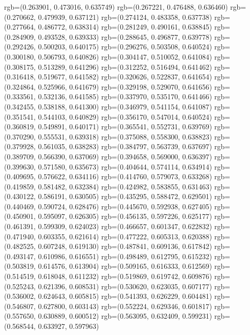 {{{					rgb=(0.263901, 0.473016, 0.635749)
					rgb=(0.267221, 0.476488, 0.636460)
					rgb=(0.270662, 0.479939, 0.637121)
					rgb=(0.274124, 0.483358, 0.637738)
					rgb=(0.277664, 0.486772, 0.638314)
					rgb=(0.281249, 0.490161, 0.638845)
					rgb=(0.284909, 0.493528, 0.639333)
					rgb=(0.288645, 0.496877, 0.639778)
					rgb=(0.292426, 0.500203, 0.640175)
					rgb=(0.296276, 0.503508, 0.640524)
					rgb=(0.300180, 0.506793, 0.640826)
					rgb=(0.304147, 0.510052, 0.641084)
					rgb=(0.308175, 0.513289, 0.641296)
					rgb=(0.312252, 0.516494, 0.641462)
					rgb=(0.316418, 0.519677, 0.641582)
					rgb=(0.320626, 0.522837, 0.641654)
					rgb=(0.324864, 0.525966, 0.641679)
					rgb=(0.329198, 0.529070, 0.641656)
					rgb=(0.333561, 0.532136, 0.641585)
					rgb=(0.337970, 0.535170, 0.641466)
					rgb=(0.342455, 0.538188, 0.641300)
					rgb=(0.346979, 0.541154, 0.641087)
					rgb=(0.351541, 0.544103, 0.640829)
					rgb=(0.356170, 0.547014, 0.640524)
					rgb=(0.360819, 0.549891, 0.640171)
					rgb=(0.365541, 0.552731, 0.639769)
					rgb=(0.370290, 0.555531, 0.639318)
					rgb=(0.375088, 0.558300, 0.638823)
					rgb=(0.379928, 0.561035, 0.638283)
					rgb=(0.384797, 0.563739, 0.637697)
					rgb=(0.389709, 0.566390, 0.637069)
					rgb=(0.394658, 0.569000, 0.636397)
					rgb=(0.399630, 0.571580, 0.635673)
					rgb=(0.404644, 0.574114, 0.634914)
					rgb=(0.409695, 0.576622, 0.634116)
					rgb=(0.414760, 0.579073, 0.633268)
					rgb=(0.419859, 0.581482, 0.632384)
					rgb=(0.424982, 0.583855, 0.631463)
					rgb=(0.430122, 0.586191, 0.630505)
					rgb=(0.435295, 0.588472, 0.629501)
					rgb=(0.440469, 0.590724, 0.628476)
					rgb=(0.445670, 0.592938, 0.627405)
					rgb=(0.450901, 0.595097, 0.626305)
					rgb=(0.456135, 0.597226, 0.625177)
					rgb=(0.461391, 0.599309, 0.624023)
					rgb=(0.466657, 0.601347, 0.622832)
					rgb=(0.471940, 0.603355, 0.621614)
					rgb=(0.477222, 0.605313, 0.620388)
					rgb=(0.482525, 0.607248, 0.619130)
					rgb=(0.487841, 0.609136, 0.617842)
					rgb=(0.493147, 0.610986, 0.616551)
					rgb=(0.498489, 0.612795, 0.615232)
					rgb=(0.503819, 0.614576, 0.613904)
					rgb=(0.509165, 0.616333, 0.612569)
					rgb=(0.514519, 0.618048, 0.611232)
					rgb=(0.519869, 0.619742, 0.609876)
					rgb=(0.525243, 0.621396, 0.608531)
					rgb=(0.530620, 0.623035, 0.607177)
					rgb=(0.536002, 0.624643, 0.605815)
					rgb=(0.541393, 0.626229, 0.604481)
					rgb=(0.546807, 0.627800, 0.603143)
					rgb=(0.552224, 0.629346, 0.601817)
					rgb=(0.557650, 0.630889, 0.600512)
					rgb=(0.563095, 0.632409, 0.599231)
					rgb=(0.568544, 0.633927, 0.597963)
}}}
